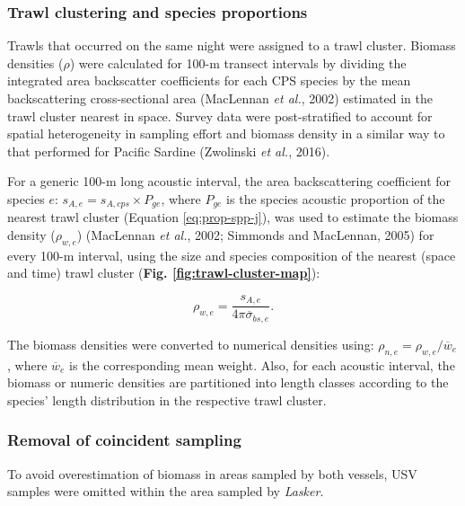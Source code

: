 \documentclass[]{article}
\begin{document}
\hypertarget{methods-trawl-clustering}{%
\subsubsection{Trawl clustering and species proportions}\label{methods-trawl-clustering}}

Trawls that occurred on the same night were assigned to a trawl cluster. Biomass densities (\(\rho\)) were calculated for 100-m transect intervals by dividing the integrated area backscatter coefficients for each CPS species by the mean backscattering cross-sectional area (MacLennan \emph{et al.}, 2002) estimated in the trawl cluster nearest in space. Survey data were post-stratified to account for spatial heterogeneity in sampling effort and biomass density in a similar way to that performed for Pacific Sardine (Zwolinski \emph{et al.}, 2016).

For a generic 100-m long acoustic interval, the area backscattering coefficient for species \(e\): \(s_{A,e} = s_{A,cps} \times P_{ge}\), where \(P_{ge}\) is the species acoustic proportion of the nearest trawl cluster (Equation \eqref{eq:prop-spp-j}), was used to estimate the biomass density (\(\rho_{w,e}\)) (MacLennan \emph{et al.}, 2002; Simmonds and MacLennan, 2005) for every 100-m interval, using the size and species composition of the nearest (space and time) trawl cluster (\textbf{Fig. \ref{fig:trawl-cluster-map}}):

\begin{equation}
  \rho_{w,e} = \frac{s_{A,e}}{4\pi\overline{\sigma}_{bs,e}}\text{.}
  \label{eq:biomass-density}
\end{equation}

The biomass densities were converted to numerical densities using: \(\rho_{n,e}=\rho_{w,e}/\overline{w}_e\), where \(\overline{w}_e\) is the corresponding mean weight. Also, for each acoustic interval, the biomass or numeric densities are partitioned into length classes according to the species' length distribution in the respective trawl cluster.

\hypertarget{removal-of-coincident-sampling}{%
\subsubsection{Removal of coincident sampling}\label{removal-of-coincident-sampling}}

To avoid overestimation of biomass in areas sampled by both vessels, USV samples were omitted within the area sampled by \emph{Lasker}.
\end{document}
